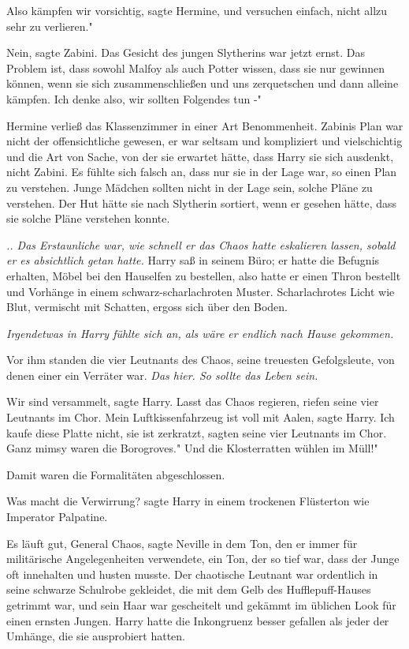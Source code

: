 \glqq Also kämpfen wir vorsichtig\grqq{}, sagte Hermine, \glqq und versuchen
einfach, nicht allzu sehr zu verlieren."

\glqq Nein\grqq{}, sagte Zabini. Das Gesicht des jungen Slytherins war jetzt
ernst. \glqq Das Problem ist, dass sowohl Malfoy als auch Potter wissen, dass
sie nur gewinnen können, wenn sie sich zusammenschließen und uns zerquetschen
und dann alleine kämpfen. Ich denke also, wir sollten Folgendes tun -"

Hermine verließ das Klassenzimmer in einer Art Benommenheit. Zabinis Plan war
nicht der offensichtliche gewesen, er war seltsam und kompliziert und
vielschichtig und die Art von Sache, von der sie erwartet hätte, dass Harry sie
sich ausdenkt, nicht Zabini. Es fühlte sich falsch an, dass nur sie in der Lage
war, so einen Plan zu verstehen. Junge Mädchen sollten nicht in der Lage sein,
solche Pläne zu verstehen. Der Hut hätte sie nach Slytherin sortiert, wenn er
gesehen hätte, dass sie solche Pläne verstehen konnte.


\emph{.. Das Erstaunliche war, wie schnell er das Chaos hatte eskalieren lassen, sobald er es absichtlich getan hatte.}
Harry saß in seinem Büro; er hatte die Befugnis erhalten, Möbel bei den
Hauselfen zu bestellen, also hatte er einen Thron bestellt und Vorhänge in einem
schwarz-scharlachroten Muster. Scharlachrotes Licht wie Blut, vermischt mit
Schatten, ergoss sich über den Boden.

\emph{Irgendetwas in Harry fühlte sich an, als wäre er endlich nach Hause gekommen.}

Vor ihm standen die vier Leutnants des Chaos, seine treuesten Gefolgsleute, von
denen einer ein Verräter war.\emph{ Das hier. So sollte das Leben sein.}

\glqq Wir sind versammelt\grqq{}, sagte Harry. \glqq Lasst das Chaos
regieren\grqq{}, riefen seine vier Leutnants im Chor. \glqq Mein
Luftkissenfahrzeug ist voll mit Aalen\grqq{}, sagte Harry. \glqq Ich kaufe diese
Platte nicht, sie ist zerkratzt\grqq{}, sagten seine vier Leutnants im Chor.
\glqq Ganz mimsy waren die Borogroves." \glqq Und die Klosterratten wühlen im
Müll!"

Damit waren die Formalitäten abgeschlossen.

\glqq Was macht die Verwirrung?\grqq{} sagte Harry in einem trockenen Flüsterton
wie Imperator Palpatine.

\glqq Es läuft gut, General Chaos\grqq{}, sagte Neville in dem Ton, den er immer
für militärische Angelegenheiten verwendete, ein Ton, der so tief war, dass der
Junge oft innehalten und husten musste. Der chaotische Leutnant war ordentlich
in seine schwarze Schulrobe gekleidet, die mit dem Gelb des Hufflepuff-Hauses
getrimmt war, und sein Haar war gescheitelt und gekämmt im üblichen Look für
einen ernsten Jungen. Harry hatte die Inkongruenz besser gefallen als jeder der
Umhänge, die sie ausprobiert hatten.

